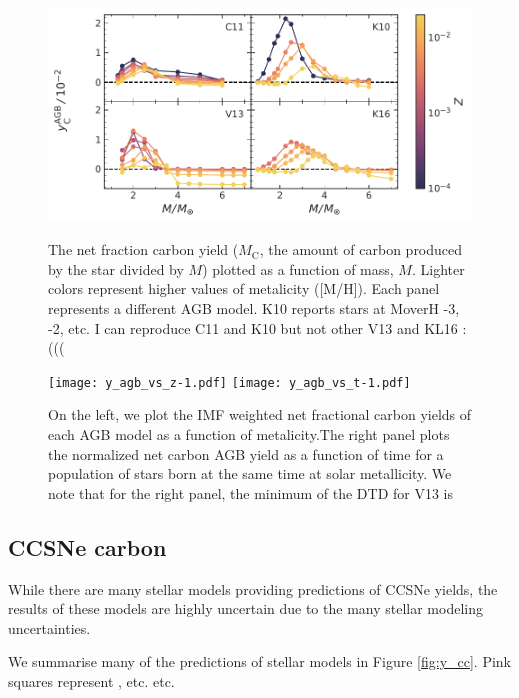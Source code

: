 \documentclass[fleqn,usenatbib]{mnras}
\begin{document}
\begin{figure}
    \centering
 	    \includegraphics[scale=1]{agb_yields.pdf}\\

    \caption{The net fraction carbon yield ($M_\text{C}$, the amount of carbon produced by the star divided by $M$) plotted as a function of mass, $M$. Lighter colors represent higher values of metalicity ([M/H]). Each panel represents a different AGB model. K10 reports stars at MoverH -3, -2, etc. I can reproduce C11 and K10 but not other V13 and KL16 :(((}

    \label{fig:y_agb}
\end{figure}

\begin{figure}
    \centering
    
    \texttt{[image: y\_agb\_vs\_z-1.pdf]}
    \texttt{[image: y\_agb\_vs\_t-1.pdf]}

    \caption{On the left, we plot the IMF weighted net fractional carbon yields of each AGB model as a function of metalicity.The right panel plots the normalized net carbon AGB yield as a function of time for a population of stars born at the same time at solar metallicity. We note that for the right panel, the minimum of the DTD for V13 is }

\end{figure}

\subsection{CCSNe carbon}

While there are many stellar models providing predictions of CCSNe yields, the results of these models are highly uncertain due to the many stellar modeling uncertainties. 

We summarise many of the predictions of stellar models in Figure \ref{fig:y_cc}. Pink squares
represent \citep{NKT13}, etc. etc.
\citep{LC18}
\citep{sukhbold+16}
\citep{WW95}
\end{document}
